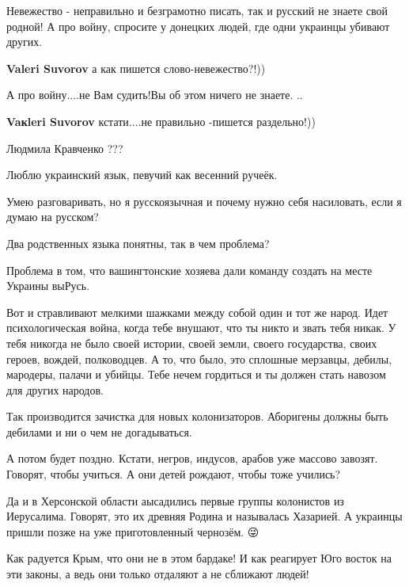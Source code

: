 \begin{itemize}
\begin{itemize}
Невежество - неправильно и безграмотно писать, так и русский не знаете свой
родной! А про войну, спросите у донецких людей, где одни украинцы убивают
других.

\textbf{Valeri Suvorov} а как пишется слово-невежество?!))

А про войну....не Вам судить!Вы об этом ничего не знаете. ..

\textbf{Vaкleri Suvorov} кстати....не правильно -пишется раздельно!))

Людмила Кравченко ???
\end{itemize}


Люблю украинский язык, певучий как весенний ручеёк.

Умею разговаривать, но я русскоязычная и почему нужно себя насиловать, если я
думаю на русском?

Два родственных языка понятны, так в чем проблема?


Проблема в том, что вашингтонские хозяева дали команду создать на месте Украины выРусь.

Вот и стравливают мелкими шажками между собой один и тот же народ. Идет
психологическая война, когда тебе внушают, что ты никто и звать тебя никак. У
тебя никогда не было своей истории, своей земли, своего государства, своих
героев, вождей, полководцев. А то, что было, это сплошные мерзавцы, дебилы,
мародеры, палачи и убийцы. Тебе нечем гордиться и ты должен стать навозом для
других народов.

Так производится зачистка для новых колонизаторов. Аборигены должны быть
дебилами и ни о чем не догадываться.

А потом будет поздно. Кстати, негров, индусов, арабов уже массово завозят.
Говорят, чтобы учиться. А они детей рождают, чтобы тоже учились?

Да и в Херсонской области аысадились первые группы колонистов из Иерусалима.
Говорят, это их древняя Родина и называлась Хазарией. А украинцы пришли позже
на уже приготовленный чернозём. 😜


Как радуется Крым, что они не в этом бардаке! И как реагирует Юго восток на эти
законы, а ведь они только отдаляют а не сближают людей!


\end{itemize}

